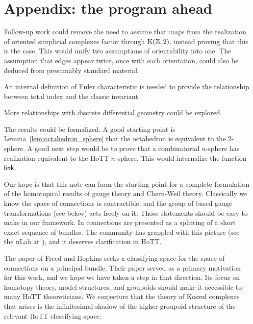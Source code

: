 \section{Appendix: the program ahead}

Follow-up work could remove the need to assume that maps from the realization of oriented simplicial complexes factor through \( \mathrm{K}(\mathbb{Z},2) \), instead proving that this is the case. This would unify two assumptions of orientability into one. The assumption that edges appear twice, once with each orientation, could also be deduced from presumably standard material.

An internal definition of Euler characteristic is needed to provide the relationship between total index and the classic invariant.

More relationships with discrete differential geometry\cite{crane_ddg}\cite{crane_connections} could be explored.

The results could be formalized. A good starting point is Lemma~\ref{lem:octahedron_sphere} that the octahedron is equivalent to the 2-sphere. A good next step would be to prove that a combinatorial \( n \)-sphere has realization equivalent to the HoTT \( n \)-sphere. This would internalize the function \( \operatorname{\mathsf{link}} \).

Our hope is that this note can form the starting point for a complete formulation of the homotopical results of gauge theory and Chern-Weil theory. Classically we know the space of connections is contractible, and the group of based gauge transformations (see below) acts freely on it. Those statements should be easy to make in our framework. In \cite{atiyah1983yang} connections are presented as a splitting of a short exact sequence of bundles. The community has grappled with this picture (see the nLab at \cite{urs_atiyah}), and it deserves clarification in HoTT.

The paper of Freed and Hopkins\cite{freed2013chernweil} seeks a classifying space for the space of connections on a principal bundle. Their paper served as a primary motivation for this work, and we hope we have taken a step in that direction. Its focus on homotopy theory, model structures, and groupoids should make it accessible to many HoTT theoreticians. We conjecture that the theory of Koszul complexes that arises is the infinitesimal shadow of the higher groupoid structure of the relevant HoTT classifying space.

